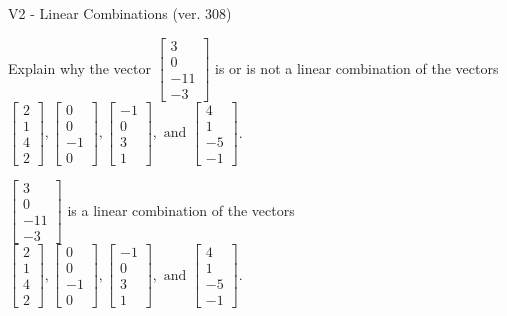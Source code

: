 \begin{exercise}
  \begin{exerciseTitle}V2 - Linear Combinations (ver. 308)\end{exerciseTitle}
  \begin{exerciseStatement}
    Explain why the vector \(\left[\begin{array}{c}
3 \\
0 \\
-11 \\
-3
\end{array}\right]\)  is or is not a linear 
	combination of the vectors \(\left[\begin{array}{c}
2 \\
1 \\
4 \\
2
\end{array}\right] , \left[\begin{array}{c}
0 \\
0 \\
-1 \\
0
\end{array}\right] , \left[\begin{array}{c}
-1 \\
0 \\
3 \\
1
\end{array}\right] , \text{ and } \left[\begin{array}{c}
4 \\
1 \\
-5 \\
-1
\end{array}\right]\).
	


  \end{exerciseStatement}
  \begin{exerciseAnswer}
   \(\left[\begin{array}{c}
3 \\
0 \\
-11 \\
-3
\end{array}\right]\) 
  	 is  
	a linear combination of the vectors \(\left[\begin{array}{c}
2 \\
1 \\
4 \\
2
\end{array}\right] , \left[\begin{array}{c}
0 \\
0 \\
-1 \\
0
\end{array}\right] , \left[\begin{array}{c}
-1 \\
0 \\
3 \\
1
\end{array}\right] , \text{ and } \left[\begin{array}{c}
4 \\
1 \\
-5 \\
-1
\end{array}\right]\).


\end{exerciseAnswer}
\end{exercise}
